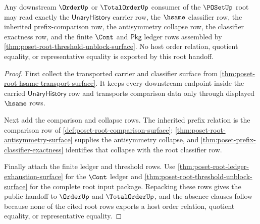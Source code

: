\begin{theorem}\label{thm:poset-root-public-handoff-boundary}
Any downstream $\OrderUp$ or $\TotalOrderUp$ consumer of the $\POSetUp$ root may
read exactly the $\mathsf{UnaryHistory}$ carrier row, the $\hsame$ classifier
row, the inherited prefix-comparison row, the antisymmetry collapse row, the
classifier exactness row, and the finite $\Cont$ and $\mathsf{Pkg}$ ledger rows
assembled by \autoref{thm:poset-root-threshold-unblock-surface}. No host order
relation, quotient equality, or representative equality is exported by this
root handoff.
\end{theorem}
\begin{proof}
First collect the transported carrier and classifier surface from
\autoref{thm:poset-root-hsame-transport-surface}. It keeps every downstream
endpoint inside the carried $\mathsf{UnaryHistory}$ row and transports
comparison data only through displayed $\hsame$ rows.

Next add the comparison and collapse rows. The inherited prefix relation is the
comparison row of \autoref{def:poset-root-comparison-surface};
\autoref{thm:poset-root-antisymmetry-surface} supplies the antisymmetry
collapse, and \autoref{thm:poset-prefix-classifier-exactness} identifies that
collapse with the root classifier row.

Finally attach the finite ledger and threshold rows. Use
\autoref{thm:poset-root-ledger-exhaustion-surface} for the $\Cont$ ledger and
\autoref{thm:poset-root-threshold-unblock-surface} for the complete root input
package. Repacking these rows gives the public handoff to $\OrderUp$ and
$\TotalOrderUp$, and the absence clauses follow because none of the cited root
rows exports a host order relation, quotient equality, or representative
equality.
\end{proof}
